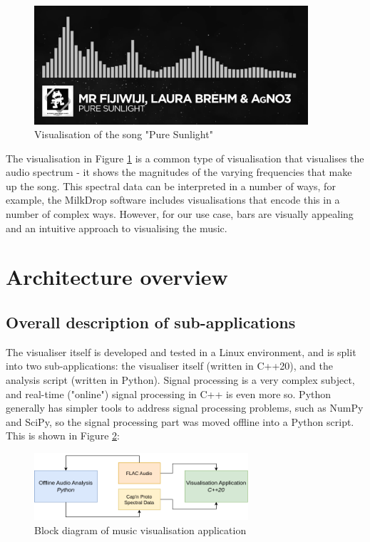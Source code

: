 \documentclass[11pt]{article}
\begin{document}
\begin{figure}[H]
\centering
\includegraphics[width=384px]{img/monstercat.png}
\caption{Visualisation of the song "Pure Sunlight" \cite{youtubeElectronicFijiWiji}}
\label{fig:monstercat}
\end{figure}

The visualisation in Figure \ref{fig:monstercat}
is a common type of visualisation that visualises the audio spectrum - it shows the magnitudes of the varying
frequencies that make up the song. This spectral data can be interpreted in a number of ways, for example, the
MilkDrop \cite{milkdrop} software includes visualisations that encode this in a number of complex ways. However,
for our use case, bars are visually appealing and an intuitive approach to visualising the music.

\section{Architecture overview}
\subsection{Overall description of sub-applications}
The visualiser itself is developed and tested in a Linux environment, and is split into two sub-applications:
the visualiser itself (written in C++20), and the analysis script (written in Python). Signal processing is a
very complex subject, and real-time ("online") signal processing in C++ is even more so. Python generally has
simpler tools to address signal processing problems, such as NumPy and SciPy, so the signal processing part
was moved offline into a Python script. This is shown in Figure \ref{fig:block}:

\begin{figure}[H]
\centering
\includegraphics[width=300px]{img/diagram.drawio.png}
\caption{Block diagram of music visualisation application}
\label{fig:block}
\end{figure}
\end{document}
